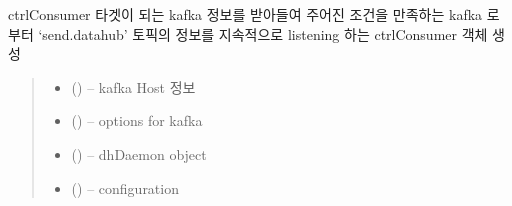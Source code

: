 \documentclass[a4paper,10pt,english]{sphinxmanual}
\begin{document}
\begin{fulllineitems}
\label{\detokenize{_ctrlKafka:ctrlConsumer}}
\pysigstartsignatures
{}
\pysigstopsignatures
\sphinxAtStartPar
ctrlConsumer
타겟이 되는 kafka 정보를 받아들여 주어진 조건을 만족하는 kafka 로부터
‘send.datahub’ 토픽의 정보를 지속적으로 listening 하는 ctrlConsumer 객체 생성
\begin{quote}\begin{description}
\begin{itemize}
\item {} 
\sphinxAtStartPar
{} () – kafka Host 정보

\item {} 
\sphinxAtStartPar
{} () – options for kafka

\item {} 
\sphinxAtStartPar
{} ({\hyperref[\detokenize{_DHDaemon:DHDaemon}]{}}) – dhDaemon object

\item {} 
\sphinxAtStartPar
{} () – configuration

\end{itemize}

\end{description}\end{quote}


\end{fulllineitems}
\end{document}
